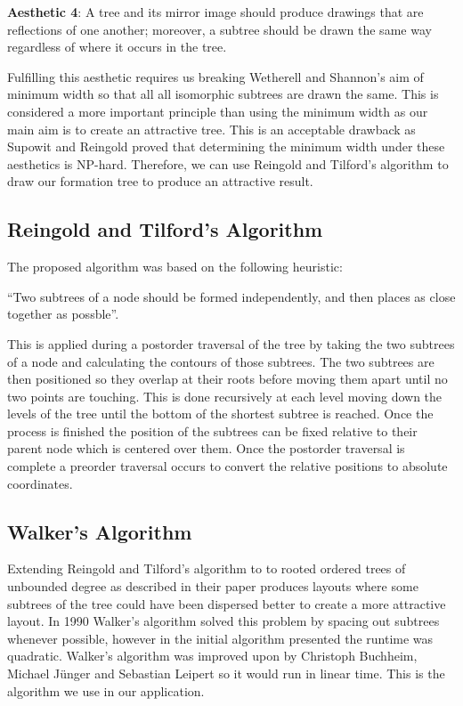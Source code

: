 \documentclass{report}
\begin{document}
\textbf{Aesthetic 4}: A tree and its mirror image should produce drawings that are reflections of one another; moreover, a subtree should be drawn the same way regardless of where it occurs in the tree.

Fulfilling this aesthetic requires us breaking Wetherell and Shannon's aim of minimum width so that all all isomorphic subtrees are drawn the same. This is considered a more important principle than using the minimum width as our main aim is to create an attractive tree. This is an acceptable drawback as Supowit and Reingold proved that determining the minimum width under these aesthetics is NP-hard\cite{complexityofdrawingtreesnicely}. Therefore, we can use Reingold and Tilford's algorithm to draw our formation tree to produce an attractive result. 

\subsection{Reingold and Tilford's Algorithm}

The proposed algorithm was based on the following heuristic: 

``Two subtrees of a node should be formed independently, and then places as close together as possble''\cite{tidierdrawingsws}.

This is applied during a postorder traversal of the tree by taking the two subtrees of a node and calculating the contours of those subtrees. The two subtrees are then positioned so they overlap at their roots before moving them apart until no two points are touching. This is done recursively at each level moving down the levels of the tree until the bottom of the shortest subtree is reached. Once the process is finished the position of the subtrees can be fixed relative to their parent node which is centered over them. Once the postorder traversal is complete a preorder traversal occurs to convert the relative positions to absolute coordinates.

\subsection{Walker's Algorithm}

Extending Reingold and Tilford's algorithm to to rooted ordered trees of unbounded degree as described in their paper produces layouts where some subtrees of the tree could have been dispersed better to create a more attractive layout. In 1990 Walker's algorithm solved this problem by spacing out subtrees whenever possible, however in the initial algorithm presented the runtime was quadratic. Walker's algorithm was improved upon by Christoph Buchheim, Michael J\"unger and Sebastian Leipert so it would run in linear time\cite{improvingwalkers}. This is the algorithm we use in our application. 
\end{document}

